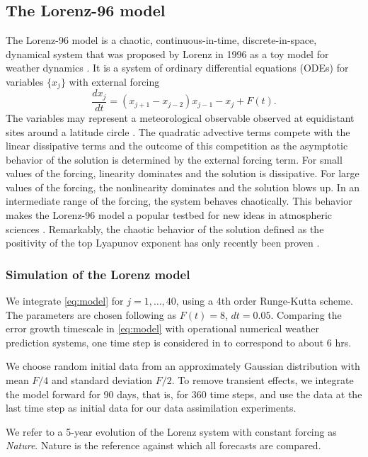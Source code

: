 \documentclass[10pt]{article}
\newcommand \be {\begin{equation}}
\newcommand \ee {\end{equation}}
\begin{document}
\subsection{The Lorenz-96 model}
The Lorenz-96 model is a chaotic, continuous-in-time, discrete-in-space, dynamical system that was proposed by Lorenz in 1996 as a toy model for weather dynamics \cite{Lorenz96}. It is a system of ordinary differential equations (ODEs) for variables $\{x_j\}$ with external forcing
\be \label{eq:model} \frac{dx_j}{dt} = ( x_{j+1} - x_{j-2} ) x_{j-1} - x_j + F(t). \ee
The variables may represent a meteorological observable observed at equidistant sites around a latitude circle \cite{LorenzEmanuel98}. The quadratic advective terms compete with the linear dissipative terms and the outcome of this competition as the asymptotic behavior of the solution is determined by the external forcing term. For small values of the forcing, linearity dominates and the solution is dissipative. For large values of the forcing, the nonlinearity dominates and the solution blows up. In an intermediate range of the forcing, the system behaves chaotically. This behavior makes the Lorenz-96 model a popular testbed for new ideas in atmospheric sciences \cite{LorenzEmanuel98,Boffetta02,Ott04,Pazo08, Karimi10, Majda17}. Remarkably, the chaotic behavior of the solution defined as the positivity of the top Lyapunov exponent has only recently been proven \cite{Bedrossian20}. 

\subsubsection{Simulation of the Lorenz model}

We integrate \eqref{eq:model} for $j=1,\dots,40$, using a 4th order Runge-Kutta scheme. The parameters are chosen following \cite{LorenzEmanuel98} as $F(t)=8$, $dt = 0.05$. Comparing the error growth timescale in \eqref{eq:model} with operational numerical weather prediction systems, one time step is considered in \cite{LorenzEmanuel98} to correspond to about 6 hrs. 

We choose random initial data from an approximately Gaussian distribution with mean $F/4$ and standard deviation $F/2$. To remove transient effects, we integrate the model forward for 90 days, that is, for $360$ time steps, and use the data at the last time step as initial data for our data assimilation experiments.

We refer to a 5-year evolution of the Lorenz system with constant forcing as {\it Nature}. Nature is the reference against which all forecasts are compared. 
\end{document}

